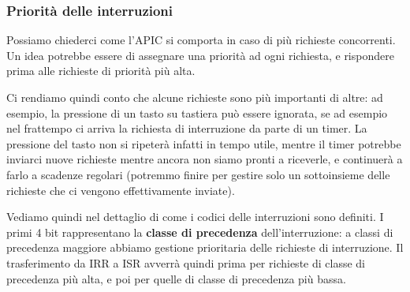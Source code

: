 \documentclass[a4paper,11pt]{article}
\begin{document}
\subsubsection{Priorità delle interruzioni}
Possiamo chiederci come l'APIC si comporta in caso di più richieste concorrenti.
Un idea potrebbe essere di assegnare una priorità ad ogni richiesta, e rispondere prima alle richieste di priorità più alta.

Ci rendiamo quindi conto che alcune richieste sono più importanti di altre: ad esempio, la pressione di un tasto su tastiera può essere ignorata, se ad esempio nel frattempo ci arriva la richiesta di interruzione da parte di un timer.
La pressione del tasto non si ripeterà infatti in tempo utile, mentre il timer potrebbe inviarci nuove richieste mentre ancora non siamo pronti a riceverle, e continuerà a farlo a scadenze regolari (potremmo finire per gestire solo un sottoinsieme delle richieste che ci vengono effettivamente inviate).

Vediamo quindi nel dettaglio di come i codici delle interruzioni sono definiti.
I primi 4 bit rappresentano la \textbf{classe di precedenza} dell'interruzione: a classi di precedenza maggiore abbiamo gestione prioritaria delle richieste di interruzione.
Il trasferimento da IRR a ISR avverrà quindi prima per richieste di classe di precedenza più alta, e poi per quelle di classe di precedenza più bassa.
\end{document}

